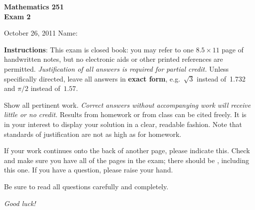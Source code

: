 \documentclass[12pt]{exam}
\begin{document}
\addpoints

\noindent
\textbf{{\large Mathematics 251 \\ Exam 2}}

\noindent
October 26, 2011  \hfill Name: \underline{\hspace{3in}}


\noindent
\textbf{Instructions}: This exam is closed book: you may refer to one $8.5 \times 11$ page of handwritten notes, but no electronic aids or
other printed references are permitted. \emph{Justification of all answers is required
for partial credit.} Unless
specifically directed, leave all answers in \textbf{exact form}, e.g.\
$\sqrt{3}$ instead of~1.732 and $\pi/2$ instead of~$1.57$.

Show all pertinent work. \emph{Correct answers without accompanying work will receive little or no credit.} Results from homework or from class can be cited freely. It is in your interest to display your solution in a
clear, readable fashion. Note that standards of justification are not as high as for homework.

If your work continues onto the back of another page, please indicate
this. Check and make sure you have all of the pages in the
exam; there should be \numpages, including this one. If you have a
question, please raise your hand.

Be sure to read all questions carefully and completely.

\vspace*{1.0in}

\begin{center}
\combinedgradetable[h]
\end{center}

\vspace*{0.5in}

\begin{center}
{\Large \emph{Good luck!}}
\end{center}

\newpage
\end{document}
